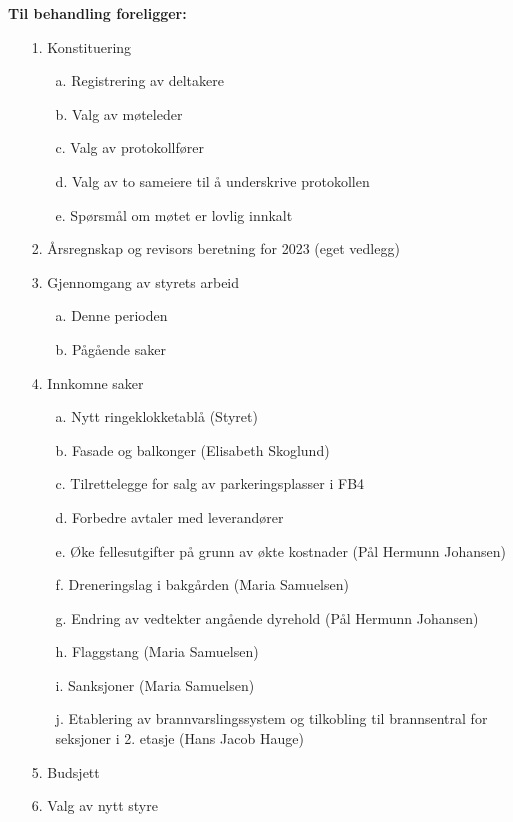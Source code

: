 \documentclass[12pt]{article}
\begin{document}
{\bf Til behandling foreligger:}
\begin{enumerate}[topsep=1pt,itemsep=1pt,partopsep=1pt, parsep=1pt]
\item[1.] Konstituering
  \begin{enumerate}[topsep=1pt,itemsep=1pt,partopsep=1pt, parsep=1pt]
    \item[a.] Registrering av deltakere
    \item[b.] Valg av møteleder
    \item[c.] Valg av protokollfører
    \item[d.] Valg av to sameiere til å underskrive protokollen
    \item[e.] Spørsmål om møtet er lovlig innkalt
  \end{enumerate}
\item[2.] Årsregnskap og revisors beretning for 2023 (eget vedlegg)
\item[3.] Gjennomgang av styrets arbeid
  \begin{enumerate}[topsep=1pt,itemsep=1pt,partopsep=1pt, parsep=1pt]
  \item[a.] Denne perioden
  \item[b.] Pågående saker
  \end{enumerate}
\item[4.] Innkomne saker
  \begin{enumerate}[topsep=1pt,itemsep=1pt,partopsep=1pt, parsep=1pt]
  \item[a.] Nytt ringeklokketablå (Styret)
  \item[b.] Fasade og balkonger (Elisabeth Skoglund)
  \item[c.] Tilrettelegge for salg av parkeringsplasser i FB4
  \item[d.] Forbedre avtaler med leverandører
  \item[e.] Øke fellesutgifter på grunn av økte kostnader (Pål Hermunn Johansen)
  \item[f.] Dreneringslag i bakgården (Maria Samuelsen)
  \item[g.] Endring av vedtekter angående dyrehold (Pål Hermunn Johansen)
  \item[h.] Flaggstang (Maria Samuelsen)
  \item[i.] Sanksjoner (Maria Samuelsen)
  \item[j.] Etablering av brannvarslingssystem og tilkobling til brannsentral for seksjoner i 2. etasje (Hans Jacob Hauge)
  \end{enumerate}
\item[5.] Budsjett
\item[6.] Valg av nytt styre
\end{enumerate}
\end{document}
